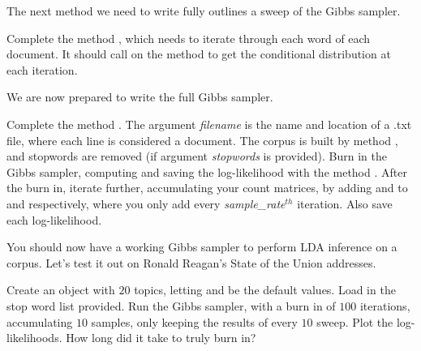 The next method we need to write fully outlines a sweep of the Gibbs sampler.

\begin{problem}
Complete the method , which needs to iterate through each word of each document. It should call on the method  to get the conditional distribution at each iteration.
\end{problem}

We are now prepared to write the full Gibbs sampler.

\begin{problem}
Complete the method . The argument \emph{filename} is the name and location of a .txt file, where each line is considered a document. The corpus is built by method , and stopwords are removed (if argument \emph{stopwords} is provided). Burn in the Gibbs sampler, computing and saving the log-likelihood with the method . After the burn in, iterate further, accumulating your count matrices, by adding  and  to  and  respectively, where you only add every \emph{sample\_rate}$^{th}$ iteration. Also save each log-likelihood.
\end{problem}

You should now have a working Gibbs sampler to perform LDA inference on a corpus. Let's test it out on Ronald Reagan's State of the Union addresses.

\begin{problem}
Create an  object with $20$ topics, letting  and  be the default values. Load in the stop word list provided. Run the Gibbs sampler, with a burn in of $100$ iterations, accumulating $10$ samples, only keeping the results of every $10$ sweep. Plot the log-likelihoods. How long did it take to truly burn in?
\end{problem}

